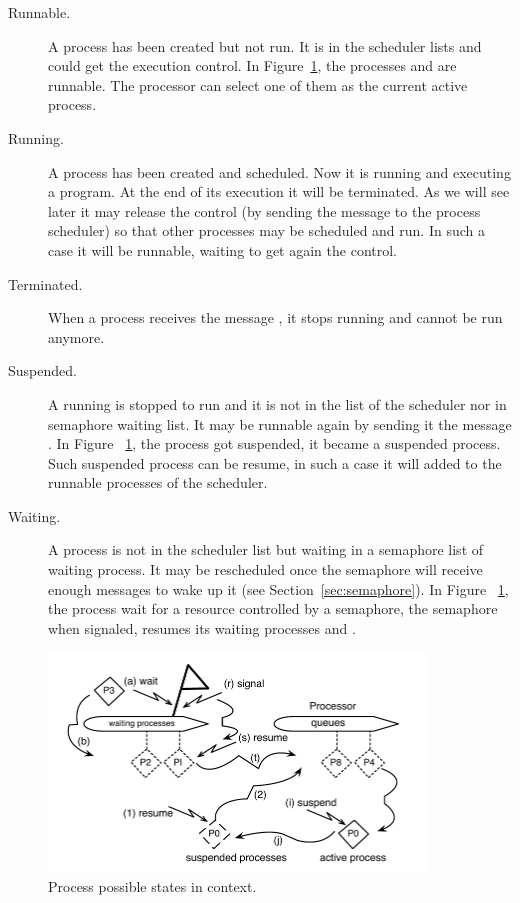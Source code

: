 \documentclass[a4paper,10pt,twoside]{book}
\begin{document}
\begin{description}
\item [Runnable.] A process has been created but not run. It is in the scheduler lists and could get the execution control. In Figure~\ref{fig:processStateInContext}, the processes  and  are runnable. The processor can select one of them as the current active process. 

\item [Running.] A process has been created and scheduled. Now it is running and executing a program. At the end of its execution it will be terminated. As we will see later it may release  the control (by sending the message  to  the process scheduler) so that other processes may be scheduled and run.  In such a case it will be runnable, \ie waiting to get again the control. 

\item [Terminated.] When a process receives the message , it stops running and cannot be run anymore. 

\item [Suspended.] A running is stopped to run and it is not in the list of the scheduler nor in semaphore waiting list. It may be runnable again by sending it the message . In Figure~
\ref{fig:processStateInContext}, the process  got suspended, it became a suspended process. Such suspended process can be resume, in such a case it will added to the runnable processes of the scheduler. 

\item [Waiting.] A process is not in the scheduler list but waiting in a semaphore list of waiting process. It may be rescheduled once the semaphore will receive enough messages  to wake up it (see Section~\ref{sec:semaphore}). In Figure~
\ref{fig:processStateInContext}, the process  wait for a resource controlled by a semaphore, the semaphore when signaled, resumes its waiting processes  and . 
\end{description}

\begin{figure}
\begin{center}
\includegraphics[width=10cm]{ProcessStateInContext}
\caption{Process possible states in context.\label{fig:processStateInContext}}
\end{center}
\end{figure}
\end{document}
